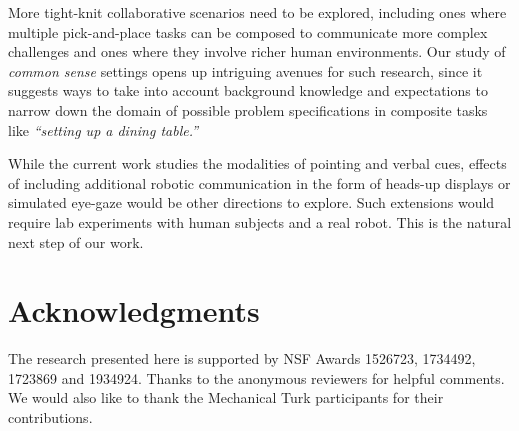 \documentclass[letterpaper]{article} %
\begin{document}

More tight-knit collaborative scenarios need to be explored, including ones where multiple pick-and-place tasks can be composed to communicate more complex challenges and ones where they involve richer human environments.  Our study of  \textit{common sense} settings opens up intriguing avenues for such research, since it suggests ways to take into account background knowledge and expectations to narrow down the domain of possible problem specifications in composite tasks like \textit{``setting up a dining table.''} 

While the current work studies the modalities of pointing and verbal cues, effects of including additional robotic communication in the form of heads-up displays or simulated eye-gaze would be other directions to explore. Such extensions would require lab experiments with human subjects and a real robot.  This is the natural next step of our work. 




\section{Acknowledgments}
The research presented here is supported by NSF Awards 1526723, 1734492, 1723869 and 1934924. Thanks to the anonymous reviewers for helpful comments. We would also like to thank the Mechanical Turk participants for their contributions.


 

\end{document}
